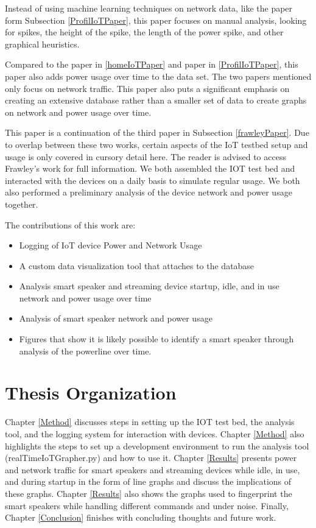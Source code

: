 Instead of using machine learning techniques on network data, like the paper form Subsection \ref{ProfilIoTPaper}, this paper focuses on manual analysis, looking for spikes, the height of the spike, the length of the power spike, and other graphical heuristics.

Compared to the paper in \ref{homeIoTPaper} and paper in \ref{ProfilIoTPaper}, this paper also adds power usage over time to the data set. The two papers mentioned only focus on network traffic. This paper also puts a significant emphasis on creating an extensive database rather than a smaller set of data to create graphs on network and power usage over time.

This paper is a continuation of the third paper in Subsection \ref{frawleyPaper}. Due to overlap between these two works, certain aspects of the IoT testbed setup and usage is only covered in cursory detail here. The reader is advised to access Frawley's work for full information. We both assembled the IOT test bed and interacted with the devices on a daily basis to simulate regular usage. We both also performed a preliminary analysis of the device network and power usage together.

The contributions of this work are:
\begin{itemize}
\item Logging of IoT device Power and Network Usage
\item A custom data visualization tool that attaches to the database
\item Analysis smart speaker and streaming device startup, idle, and in use network and power usage over time
\item Analysis of smart speaker network and power usage
\item Figures that show it is likely possible to identify a smart speaker through analysis of the powerline over time.
\end{itemize}

\section{Thesis Organization}
Chapter \ref{Method} discusses steps in setting up the IOT test bed, the analysis tool, and the logging system for interaction with devices. Chapter \ref{Method} also highlights the steps to set up a development environment to run the analysis tool (realTimeIoTGrapher.py) and how to use it. Chapter \ref{Results} presents power and network traffic for smart speakers and streaming devices while idle, in use, and during startup in the form of line graphs and discuss the implications of these graphs. Chapter \ref{Results} also shows the graphs used to fingerprint the smart speakers while handling different commands and under noise. Finally, Chapter \ref{Conclusion} finishes with concluding thoughts and future work.
